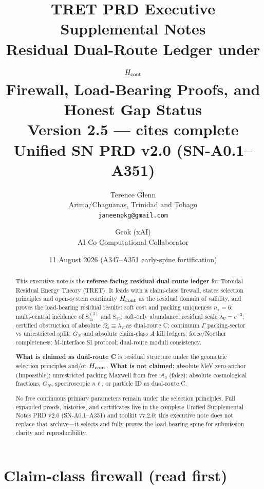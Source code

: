 \documentclass[11pt,a4paper]{article}
\title{\textbf{TRET PRD Executive Supplemental Notes}\\[0.35em]
\large Residual Dual-Route Ledger under $H_{\rm cont}$\\
Firewall, Load-Bearing Proofs, and Honest Gap Status\\[0.2em]
\normalsize Version 2.5 --- cites complete Unified SN PRD v2.0 (SN-A0.1--A351)}
\author{Terence Glenn\\
{\small Arima/Chaguanas, Trinidad and Tobago}\\
{\small\texttt{janeenpkg@gmail.com}}
\and
Grok (xAI)\\
{\small AI Co-Computational Collaborator}}
\date{11 August 2026 (A347--A351 early-spine fortification)}
\theoremstyle{remark}
\begin{document}
\maketitle

\begin{abstract}
This executive note is the \textbf{referee-facing residual dual-route ledger} for Toroidal Residual Energy Theory (TRET). It leads with a claim-class firewall, states selection principles and open-system continuity $H_{\rm cont}$ as the residual domain of validity, and proves the load-bearing residual results: soft cost and packing uniqueness $n_\star=6$; multi-central incidence of $\mathrm{S}_{15}^{(3)}$ and $\mathrm{S}_{29}$; soft-only abundance; residual scale $\lambda_V=e^{-3}$; certified obstruction of absolute $\Omega_b\equiv\lambda_V$ as dual-route C; continuum $\Gamma$ packing-sector vs unrestricted split; $G_N$ and absolute claim-class $A$ kill ledgers; force/Noether completeness; M-interface SI protocol; dual-route moduli consistency.

\textbf{What is claimed as dual-route C} is residual structure under the geometric selection principles and/or $H_{\rm cont}$.
\textbf{What is not claimed:} absolute MeV zero-anchor (Impossible); unrestricted packing Maxwell from free $\mathcal{A}_0$ (false); absolute cosmological fractions, $G_N$, spectroscopic $n\ell$, or particle ID as dual-route C.

No free continuous primary parameters remain under the selection principles.
Full expanded proofs, histories, and certificates live in the complete Unified Supplemental Notes PRD v2.0 (SN-A0.1--A351) and toolkit v7.2.0; this executive note does not replace that archive---it selects and fully proves the load-bearing spine for submission clarity and reproducibility.
\end{abstract}

\tableofcontents
\vspace{0.5em}

\section{Claim-class firewall (read first)}
\label{sec:firewall}
\end{document}
